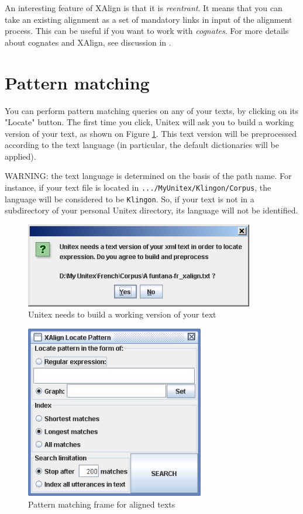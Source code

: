 \bigskip
\noindent An interesting feature of XAlign is that it is
\textit{reentrant}. It means that you can take an
existing alignment as a set of mandatory links in input of the alignment
process. This can be useful if you want to work with
\textit{cognates}. For more details about cognates and XAlign,
see discussion in \cite{IGML_PauDum08}.

\clearpage
\section{Pattern matching}
You can perform pattern matching queries on any of your texts, by clicking on
its "Locate" button. The first time you click, Unitex will ask you to build a
working version of your text, as shown on Figure \ref{fig-x-fig6}. This text
version will be preprocessed according to the text language (in particular,
the default dictionaries will be applied).

\bigskip
\noindent WARNING: the text language is determined on the basis of the path
name. For instance, if your text file is located in \verb+.../MyUnitex/Klingon/Corpus+, 
the language will be considered to be \verb+Klingon+. So, if your text is not
in a subdirectory of your personal Unitex directory, its language will not be identified.

\begin{figure}[!ht]
\begin{center}
\includegraphics[width=10cm]{resources/img/figX-6.png}
\caption{Unitex needs to build a working version of your text\label{fig-x-fig6}}
\end{center}
\end{figure}
 
\begin{figure}[!ht]
\begin{center}
\includegraphics[width=7.8cm]{resources/img/figX-7.png}
\caption{Pattern matching frame for aligned texts\label{fig-x-locate-frame}}
\end{center}
\end{figure}

